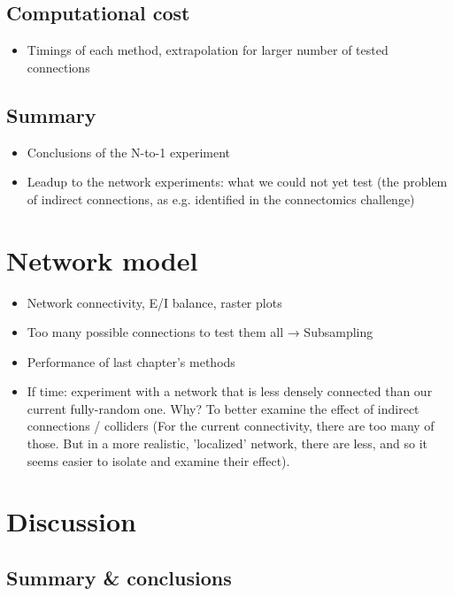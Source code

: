 \documentclass[a4paper, oneside, 11pt]{memoir}
\begin{document}
\section{Computational cost}

\begin{itemize}
    \item Timings of each method, extrapolation for larger number of tested connections
\end{itemize}

\section{Summary}

\begin{itemize}
    \item Conclusions of the N-to-1 experiment
    \item Leadup to the network experiments: what we could not yet test (the problem of indirect connections, as e.g. identified in the connectomics challenge)
\end{itemize}



\chapter{Network model}

\begin{itemize}
    \item Network connectivity, E/I balance, raster plots
    \item Too many possible connections to test them all → Subsampling
    \item Performance of last chapter's methods
    \item If time: experiment with a network that is less densely connected than our current fully-random one. Why? To better examine the effect of indirect connections / colliders (For the current connectivity, there are too many of those. But in a more realistic, 'localized' network, there are less, and so it seems easier to isolate and examine their effect).
\end{itemize}


\chapter{Discussion}

\section{Summary \& conclusions}
\end{document}
